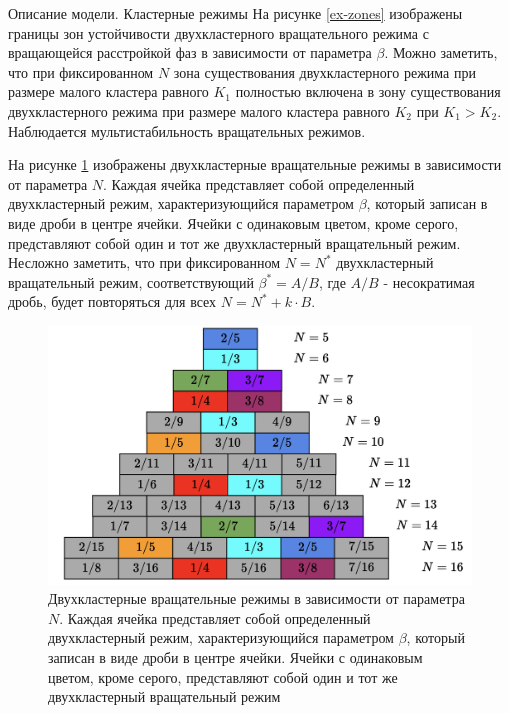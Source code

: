 \begin{chapter}{Описание модели. Кластерные режимы}
	На рисунке \ref{ex-zones} изображены границы зон устойчивости двухкластерного вращательного режима
	с вращающейся расстройкой фаз в зависимости от параметра $\beta$.
	Можно заметить, что при фиксированном $N$ зона существования двухкластерного режима при размере малого кластера равного $K_1$ полностью включена в 
	зону существования двухкластерного режима при размере малого кластера равного $K_2$ при $K_1 > K_2$. Наблюдается мультистабильность вращательных режимов.


	На рисунке \ref{schema} изображены двухкластерные вращательные режимы в зависимости от параметра $N$.
	Каждая ячейка представляет собой определенный двухкластерный режим,
	характеризующийся параметром $\beta$, который записан в виде дроби в центре ячейки. Ячейки с одинаковым цветом, кроме серого, представляют собой
	один и тот же двухкластерный вращательный режим. Несложно заметить, что при фиксированном $N = N^*$
	двухкластерный вращательный режим, соответствующий $\beta^* = A/B$, где $A/B$ - несократимая дробь, 
	будет повторяться для всех $N = N^* + k\cdot B$. 

	\begin{figure}[h!]
		\begin{center}
			\includegraphics[width=1\columnwidth]{pictures/schema.png}
		\end{center}
		\caption{Двухкластерные вращательные режимы в зависимости от параметра $N$. Каждая ячейка представляет собой определенный двухкластерный режим,
		характеризующийся параметром $\beta$, который записан в виде дроби в центре ячейки. Ячейки с одинаковым цветом, кроме серого, представляют собой
		один и тот же двухкластерный вращательный режим}
		\label{schema}
	\end{figure}

\end{chapter}